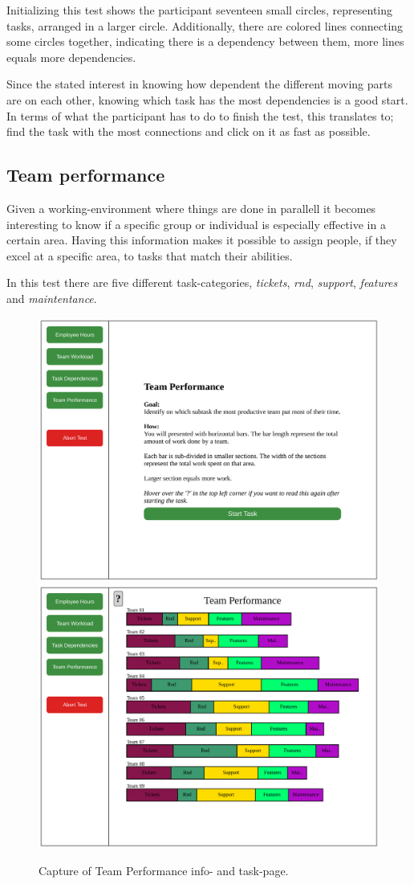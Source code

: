 {    Initializing this test shows the participant seventeen small circles,
    representing tasks, arranged in a larger circle. Additionally, there are
    colored lines connecting some circles together, indicating there is
    a dependency between them, more lines equals more dependencies.

    Since the stated interest in knowing how dependent the different
    moving parts are on each other, knowing which task has the most
    dependencies is a good start. In terms of what the participant has to
    do to finish the test, this translates to; find the task with the most
    connections and click on it as fast as possible.

    \newpage
    \subsection{Team performance}

    \textit{\ideaFour}

    Given a working-environment where things are done in parallell it
    becomes interesting to know if a specific group or individual is
    especially effective in a certain area. Having this information makes
    it possible to assign people, if they excel at a specific area, to
    tasks that match their abilities.

    In this test there are five different task-categories,
    \textit{tickets},
    \textit{rnd},
    \textit{support},
    \textit{features} and
    \textit{maintentance}.

    \begin{figure}[h!]
      \centering
      \includegraphics[width=.49\textwidth]{figures/captures/webapp_team_performance_info.pdf}
      \includegraphics[width=.49\textwidth]{figures/captures/webapp_team_performance_task.pdf}
      \caption{Capture of Team Performance info- and task-page.}
    \end{figure}

}
